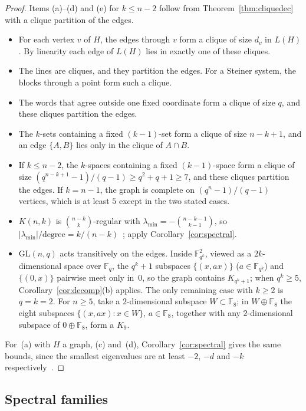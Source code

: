 \documentclass[11pt]{amsart}
\theoremstyle{tplain}
\theoremstyle{tdefinition}
\theoremstyle{tremark}
\newcommand{\lmin}{\lambda_{\min}}
\begin{document}
\begin{proof}
Items (a)--(d) and (e) for $k\le n-2$ follow from Theorem~\ref{thm:cliquedec}
with a clique partition of the edges.
\begin{itemize}
\item[(a)] For each vertex $v$ of $H$, the edges through $v$ form a clique of
  size $d_v$ in $L(H)$. By linearity each edge of $L(H)$ lies in exactly one of
  these cliques.
\item[(b)] The lines are cliques, and they partition the edges. For a Steiner
  system, the blocks through a point form such a clique.
\item[(c)] The words that agree outside one fixed coordinate form a clique of
  size $q$, and these cliques partition the edges.
\item[(d)] The $k$-sets containing a fixed $(k-1)$-set form a clique of size
  $n-k+1$, and an edge $\{A,B\}$ lies only in the clique of $A\cap B$.
\item[(e)] If $k\le n-2$, the $k$-spaces containing a fixed $(k-1)$-space form
  a clique of size $(q^{n-k+1}-1)/(q-1)\ge q^2+q+1\ge7$, and these cliques
  partition the edges. If $k=n-1$, the graph is complete on
  $(q^n-1)/(q-1)$ vertices, which is at least $5$ except in the two stated
  cases.
\item[(f)] $K(n,k)$ is $\binom{n-k}k$-regular with
  $\lmin=-\binom{n-k-1}{k-1}$, so $|\lmin|/\text{degree}=k/(n-k)$~\cite{bh}; apply
  Corollary~\ref{cor:spectral}.
\item[(g)] $\mathrm{GL}(n,q)$ acts transitively on the edges. Inside
  $\mathbb F_{q^k}^2$, viewed as a $2k$-dimensional space over $\mathbb F_q$,
  the $q^k+1$ subspaces $\{(x,ax)\}$ ($a\in\mathbb F_{q^k}$) and $\{(0,x)\}$
  pairwise meet only in~$0$, so the graph contains $K_{q^k+1}$; when
  $q^k\ge5$, Corollary~\ref{cor:decomp}(b) applies. The only remaining case
  with $k\ge2$ is $q=k=2$. For $n\ge5$, take a $2$-dimensional subspace
  $W\subset\mathbb F_8$; in $W\oplus\mathbb F_8$ the eight subspaces
  $\{(x,ax):x\in W\}$, $a\in\mathbb F_8$, together with any $2$-dimensional
  subspace of $0\oplus\mathbb F_8$, form a $K_9$.
\end{itemize}
For~(a) with $H$ a graph, (c) and~(d), Corollary~\ref{cor:spectral} gives the
same bounds, since the smallest eigenvalues are at least $-2$, $-d$ and $-k$
respectively~\cite{bh}.
\end{proof}

\subsection{Spectral families}
\end{document}
